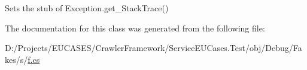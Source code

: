 Sets the stub of Exception.\-get\-\_\-\-Stack\-Trace()



The documentation for this class was generated from the following file\-:\begin{DoxyCompactItemize}
\item 
D\-:/\-Projects/\-E\-U\-C\-A\-S\-E\-S/\-Crawler\-Framework/\-Service\-E\-U\-Cases.\-Test/obj/\-Debug/\-Fakes/s/\hyperlink{s_2f_8cs}{f.\-cs}\end{DoxyCompactItemize}

